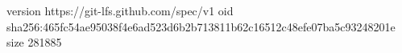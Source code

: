 version https://git-lfs.github.com/spec/v1
oid sha256:465fc54ae95038f4e6ad523d6b2b713811b62c16512c48efe07ba5c93248201e
size 281885

